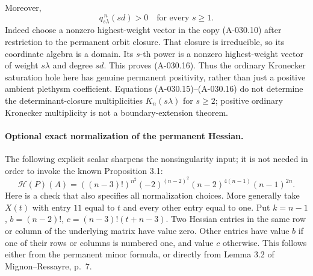 Moreover,
\[
                         q_{s\lambda}^{\,n}(sd)>0
                         \quad\text{for every }s\geq1.          \tag{A-030.16}
\]
Indeed choose a nonzero highest-weight vector in the copy
(A-030.10) after restriction to the permanent orbit closure.
That closure is irreducible, so its coordinate algebra is a
domain. Its \(s\)-th power is a nonzero highest-weight vector
of weight \(s\lambda\) and degree \(sd\). This proves
(A-030.16). Thus the ordinary Kronecker saturation hole here
has genuine permanent positivity, rather than just a positive
ambient plethysm coefficient. Equations (A-030.15)--(A-030.16)
do not determine the determinant-closure multiplicities
\(K_n(s\lambda)\) for \(s\geq2\); positive ordinary Kronecker
multiplicity is not a boundary-extension theorem.

\paragraph{Optional exact normalization of the permanent Hessian.}
The following explicit scalar sharpens the nonsingularity input;
it is not needed in order to invoke the known Proposition 3.1:
\[
 \mathcal H(P)(A)=
 ((n-3)!)^{n^2}(-2)^{(n-2)^2}
             (n-2)^{4(n-1)}(n-1)^{2n}.                        \tag{A-030.12}
\]
Here is a check that also specifies all normalization choices.
More generally take \(X(t)\) with entry \(11\) equal to \(t\)
and every other entry equal to one. Put
\(k=n-1\), \(b=(n-2)!\),
\(c=(n-3)!(t+n-3)\). Two Hessian entries in the same row or
column of the underlying matrix have value zero. Other entries
have value \(b\) if one of their rows or columns is numbered
one, and value \(c\) otherwise. This follows either from
the permanent minor formula, or directly from Lemma 3.2 of
Mignon--Ressayre, p.~7.

